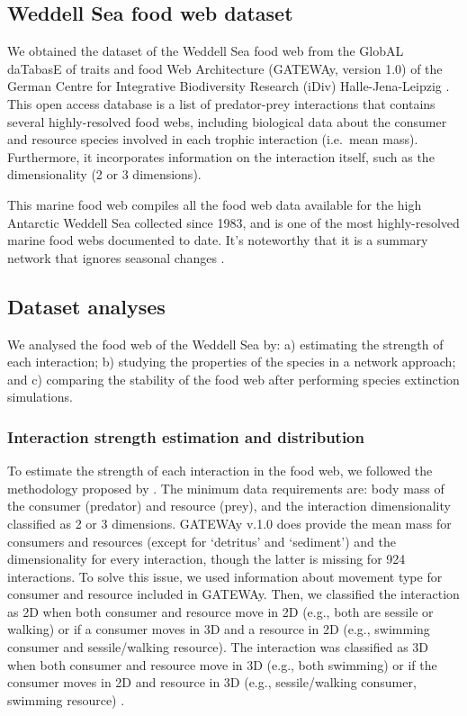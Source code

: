 \documentclass[gc, manuscript]{copernicus}
\begin{document}
\subsection{Weddell Sea food web dataset}

We obtained the dataset of the Weddell Sea food web from the GlobAL
daTabasE of traits and food Web Architecture (GATEWAy, version 1.0) of
the German Centre for Integrative Biodiversity Research (iDiv)
Halle-Jena-Leipzig \citep{Brose2018}. This open access database is a
list of predator-prey interactions that contains several highly-resolved
food webs, including biological data about the consumer and resource
species involved in each trophic interaction (i.e.~mean mass).
Furthermore, it incorporates information on the interaction itself, such
as the dimensionality (2 or 3 dimensions).

This marine food web compiles all the food web data available for the
high Antarctic Weddell Sea collected since 1983, and is one of the most
highly-resolved marine food webs documented to date. It's noteworthy
that it is a summary network that ignores seasonal changes
\citep{Jacob2011}.

\subsection{Dataset analyses}

We analysed the food web of the Weddell Sea by: a) estimating the
strength of each interaction; b) studying the properties of the species
in a network approach; and c) comparing the stability of the food web
after performing species extinction simulations.

\subsubsection{Interaction strength estimation and distribution}

To estimate the strength of each interaction in the food web, we
followed the methodology proposed by \citet{Pawar2012}. The minimum data
requirements are: body mass of the consumer (predator) and resource
(prey), and the interaction dimensionality classified as 2 or 3
dimensions. GATEWAy v.1.0 does provide the mean mass for consumers and
resources (except for `detritus' and `sediment') and the dimensionality
for every interaction, though the latter is missing for 924
interactions. To solve this issue, we used information about movement
type for consumer and resource included in GATEWAy. Then, we classified
the interaction as 2D when both consumer and resource move in 2D (e.g.,
both are sessile or walking) or if a consumer moves in 3D and a resource
in 2D (e.g., swimming consumer and sessile/walking resource). The
interaction was classified as 3D when both consumer and resource move in
3D (e.g., both swimming) or if the consumer moves in 2D and resource in
3D (e.g., sessile/walking consumer, swimming resource)
\citep{Pawar2012}.
\end{document}
